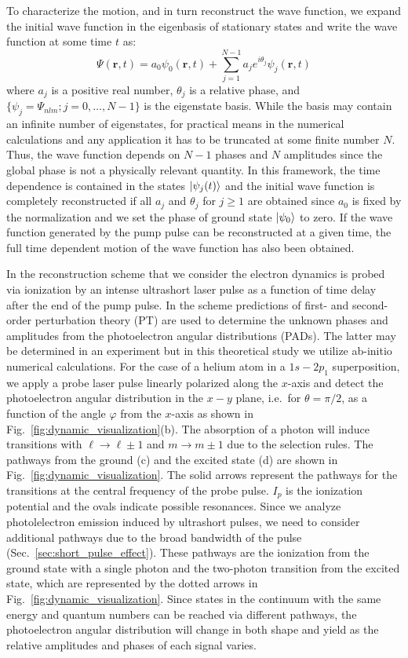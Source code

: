 To characterize the motion, and in turn reconstruct the wave function, we expand the initial wave function in the eigenbasis of stationary states and write the wave function at some time $t$ as: 
%
\begin{equation}
    \Psi({\bm r},t) = a_0 \psi_0({\bm r},t) + \sum_{j=1}^{N-1} a_j e^{i\theta_j} \psi_j({\bm r},t)
    \label{eq:expansion}
\end{equation}
%
where $a_j$ is a positive real number, $\theta_j $ is a relative phase, and $\{ \psi_j = \Psi_{nlm}; j = 0, \ldots, N-1\}$ is the eigenstate basis. While the basis may contain an infinite number of eigenstates, for practical means in the numerical calculations and any application it has to be truncated at some finite number $N$. Thus, the wave function depends on $N-1$ phases and $N$ amplitudes since the global phase is not a physically relevant quantity. In this framework, the time dependence is contained in the states $\ket{\psi_j(t)}$ and the initial wave function is completely reconstructed if all $a_j$ and $\theta_j$ for $j\geq 1$ are obtained since $a_0$ is fixed by the normalization and we set the phase of ground state $\ket{\psi_0}$ to zero. If the wave function generated by the pump pulse can be reconstructed at a given time, the full time dependent motion of the wave function has also been obtained.

In the reconstruction scheme that we consider the electron dynamics is probed via ionization by an intense ultrashort laser pulse as a function of time delay  after the end of the pump pulse. In the scheme predictions of first- and second-order perturbation theory (PT) are used to determine the unknown phases and amplitudes from the photoelectron angular distributions (PADs). The latter may be determined in an experiment but in this theoretical study we utilize ab-initio numerical calculations. For the case of a helium atom in a $1s-2p_1$ superposition, we apply a probe laser pulse linearly polarized along the $x$-axis and detect the photoelectron angular distribution in the $x-y$ plane, i.e.\ for $\theta = \pi/2$, as a function of the angle $\varphi$ from the $x$-axis as shown in Fig.~\ref{fig:dynamic_visualization}(b). The absorption of a photon will induce transitions with $\ell \rightarrow \ell \pm 1$ and $m \rightarrow m \pm 1$ due to the selection rules. The pathways from the ground (c) and the excited state (d) are shown in Fig.\ \ref{fig:dynamic_visualization}. The solid arrows represent the pathways for the transitions at the central frequency of the probe pulse. $I_p$ is the ionization potential and the ovals indicate possible resonances. Since we analyze photolelectron emission induced by ultrashort pulses, we need to consider additional pathways due to the broad bandwidth of the pulse (Sec.~\ref{sec:short_pulse_effect}). These pathways are the ionization from the ground state with a single photon and the two-photon transition from the excited state, which are represented by the dotted arrows in Fig.~\ref{fig:dynamic_visualization}. Since states in the continuum with the same energy and quantum numbers can be reached via different pathways, the photoelectron angular distribution will change in both shape and yield as the relative amplitudes and phases of each signal varies.

